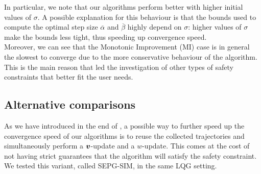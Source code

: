 In particular, we note that our algorithms perform better with higher initial values of $\sigma$. A possible explanation for this behaviour is that the bounds used to compute the optimal step size $\overline{\alpha}$ and $\overline{\beta}$ highly depend on $\sigma$: higher values of $\sigma$ make the bounds less tight, thus speeding up convergence speed.\\
Moreover, we can see that the Monotonic Improvement (MI) case is in general the slowest to converge due to the more conservative behaviour of the algorithm. This is the main reason that led the investigation of other types of safety constraints that better fit the user needs.


\begin{table}[t]

\caption[Upper bound confidence interval for LQG problem.]{Upper bound confidence intervals at 95\% of $|\vv - \vv^*|$ after 10,000 iterations.}\label{exp:convergence-speed}
\end{table}


\subsection{Alternative comparisons}

As we have introduced in the end of , a possible way to further speed up the convergence speed of our algorithms is to reuse the collected trajectories and simultaneously perform a $\boldsymbol{v}$-update and a $w$-update. This comes at the cost of not having strict guarantees that the algorithm will satisfy the safety constraint. We tested this variant, called SEPG-SIM, in the same LQG setting.


